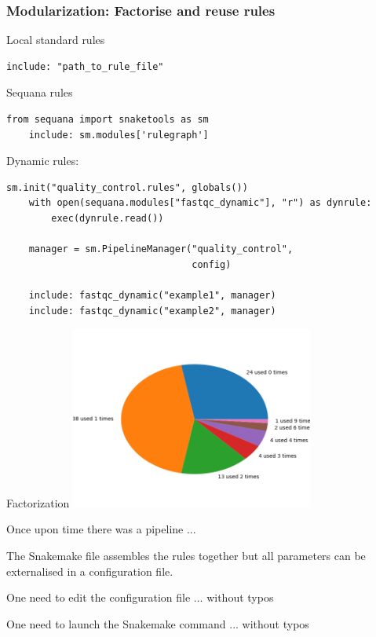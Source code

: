 \documentclass{beamer}
\begin{document}
\begin{frame}[fragile]
 \frametitle{Modularization: Factorise and reuse rules}

 
 Local standard rules
\begin{lstlisting}[basicstyle=\ttfamily\small] 
    include: "path_to_rule_file"
\end{lstlisting}

Sequana rules
\begin{lstlisting}[basicstyle=\ttfamily\small]
    from sequana import snaketools as sm
    include: sm.modules['rulegraph']
\end{lstlisting}

Dynamic rules:
\begin{lstlisting}[basicstyle=\ttfamily\small]
    sm.init("quality_control.rules", globals())
    with open(sequana.modules["fastqc_dynamic"], "r") as dynrule:
        exec(dynrule.read())
        
    manager = sm.PipelineManager("quality_control", 
                                 config)

    include: fastqc_dynamic("example1", manager)
    include: fastqc_dynamic("example2", manager)
\end{lstlisting}
\end{frame}


\begin{frame}{Factorization}
\centering
    \includegraphics[width=8cm]{images/rules_reusing.png}
\end{frame}


\begin{frame}
 
Once upon time there was a pipeline ... 

\vspace{1cm}
\pause

The Snakemake file assembles the rules together but all parameters can be 
externalised in a configuration file. 

 \vspace{1cm}
\pause

One need to edit the configuration file ... without typos 
 
 \vspace{1cm}
\pause

One need to launch the Snakemake command ... without typos
 
\end{frame}
\end{document}
